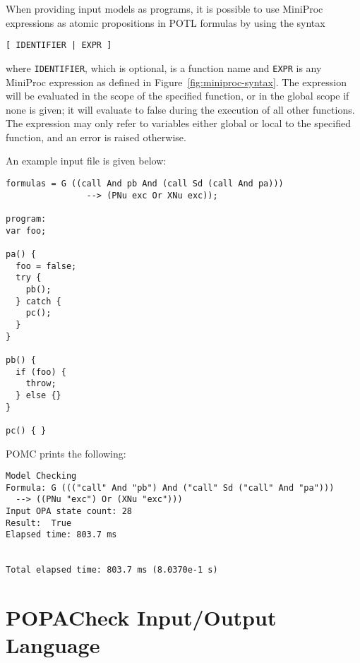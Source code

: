 \documentclass[9pt,a4paper]{article}
\begin{document}
When providing input models as programs,
it is possible to use MiniProc expressions as atomic propositions in POTL formulas
by using the syntax
\begin{center}
\verb![ IDENTIFIER | EXPR ]!
\end{center}
where \verb!IDENTIFIER!, which is optional, is a function name
and \verb!EXPR! is any MiniProc expression as defined in Figure~\ref{fig:miniproc-syntax}.
The expression will be evaluated in the scope of the specified function,
or in the global scope if none is given;
it will evaluate to false during the execution of all other functions.
The expression may only refer to variables either global or local to the specified function,
and an error is raised otherwise.

An example input file is given below:
\begin{verbatim}
formulas = G ((call And pb And (call Sd (call And pa)))
                --> (PNu exc Or XNu exc));

program:
var foo;

pa() {
  foo = false;
  try {
    pb();
  } catch {
    pc();
  }
}

pb() {
  if (foo) {
    throw;
  } else {}
}

pc() { }
\end{verbatim}

POMC prints the following:
\begin{verbatim}
Model Checking
Formula: G ((("call" And "pb") And ("call" Sd ("call" And "pa")))
  --> ((PNu "exc") Or (XNu "exc")))
Input OPA state count: 28
Result:  True
Elapsed time: 803.7 ms


Total elapsed time: 803.7 ms (8.0370e-1 s)
\end{verbatim}


\section{POPACheck Input/Output Language}
\end{document}
